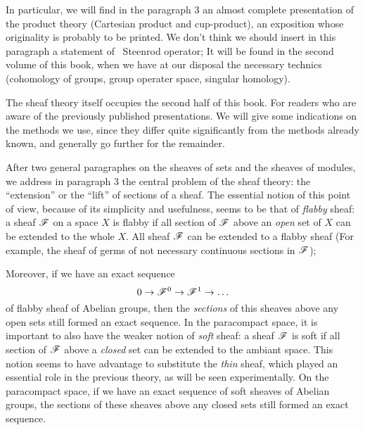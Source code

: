 In particular, we will find in the paragraph 3 an almost complete presentation of the product theory (Cartesian product and cup-product), 
an exposition whose originality is probably to be printed. 
We don't think we should insert in this paragraph a statement of ~Steenrod operator; 
It will be found in the second volume of this book, when we have at our disposal the necessary technics (cohomology of groups, group operater space, singular homology).

The sheaf theory itself occupies the second half of this book.
For readers who are aware of the previously published presentations. 
We will give some indications on the methods we use, since they differ quite significantly from the methods already known, 
and generally go further for the remainder.

After two general paragraphes on the sheaves of sets and the sheaves of modules, we address in paragraph 3 the central problem of the sheaf theory: 
the ``extension'' or the ``lift'' of sections of a sheaf. The essential notion of this point of view, because of its simplicity and usefulness, seems to be that of \emph{flabby} sheaf: 
a sheaf $\mathscr{F}$ on a space $X$ is flabby if all section of $\mathscr{F}$ above an \emph{open} set of $X$ can be extended to the whole $X$. 
All sheaf $\mathscr{F}$ can be extended to a flabby sheaf (For example, the sheaf of germs of not necessary continuous sections in $\mathscr{F}$); 

Moreover, if we have an exact sequence
\[
    0\rightarrow \mathscr{F}^0 \rightarrow \mathscr{F}^1 \rightarrow \ldots
\]
of flabby sheaf of Abelian groups, then the \emph{sections} of this sheaves above any open sets still formed an exact sequence. 
In the paracompact space, it is important to also have the weaker notion of \emph{soft} sheaf: 
a sheaf $\mathscr{F}$ is soft if all section of $\mathscr{F}$ above a \emph{closed} set can be extended to the ambiant space. 
This notion seems to have advantage to substitute the \emph{thin} sheaf, which played an essential role in the previous theory, as will be seen experimentally. 
On the paracompact space, if we have an exact sequence of soft sheaves of Abelian groups, the sections of these sheaves above any closed sets still formed an exact sequence.

